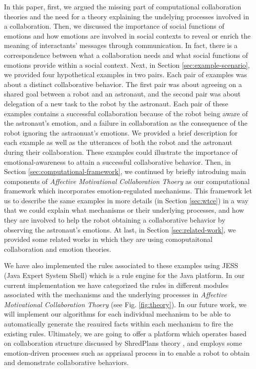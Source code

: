 In this paper, first, we argued the missing part of computational collaboration
theories and the need for a theory explaining the undelying processes involved
in a collaboration. Then, we discussed the importance of social functions of
emotions and how emotions are involved in social contexts to reveal or enrich
the meaning of interactants' messages through communication. In fact, there is a
correspondence between what a collaboration needs and what social functions of
emotions provide within a social context. Next, in Section
\ref{sec:example-scenario}, we provided four hypothetical examples in two pairs.
Each pair of examples was about a distinct collaborative behavior. The first
pair was about agreeing on a shared goal between a robot and an astronaut, and
the second pair was about delegation of a new task to the robot by the
astronaut. Each pair of these examples contains a successful collaboration
because of the robot being aware of the astronaut's emotion, and a failure in
collaboration as the consequence of the robot ignoring the astraonuat's
emotions. We provided a brief description for each example as well as the
utterances of both the robot and the astronaut during their collaboration. These
examples could illustrate the importance of emotional-awareness to attain a
successful collaborative behavior. Then, in Section
\ref{sec:computational-framework}, we continued by briefly introduing main
components of \textit{Affective Motivational Collaboration Thoery} as our
computational framework which incorporates emotion-regulated mechanisms. This
framework let us to describe the same examples in more details (in Section
\ref{sec:wtce}) in a way that we could explain what mechanisms or their
underlying processes, and how they are involved to help the robot obtaining a
collaborative behavior by observing the astronaut's emotions. At last, in
Section \ref{sec:related-work}, we provided some related works in which they are
using comoputaitonal collaboration and emotion theories.

We have also implemented the rules associated to these examples using JESS (Java
Expert System Shell) which is a rule engine for the Java platform. In our
current implementation we have categorized the rules in different modules
associated with the mechanisms and the underlying processes in \textit{Affective
Motivational Collaboration Thoery} (see Fig. \ref{fig:theory}). In our future
work, we will implement our algorithms for each individual mechanism to be able
to automatically generate the reauired facts within each mechanism to fire the
existing rules. Ultimately, we are going to offer a platform which operates
based on collaboration structure discussed by ShredPlans theory
\cite{grosz:discourse-structure}, and employs some emotion-driven processes such
as appriasal process in \cite{marsella:ema-process-model} to enable a robot to
obtain and demonstrate collaborative behaviors.

